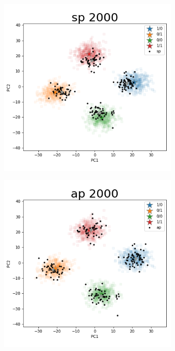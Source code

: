 \documentclass{article}
\begin{document}
\begin{figure}[p]
\begin{subfigure}{.5\textwidth}
  \centering
  \includegraphics[width=.98\linewidth]{img/ggsim2000_100000_200_2_1_100_1_sturef_ggsim2000_100000_2000_2_1_100_0_sp}
\end{subfigure}%
\begin{subfigure}{.5\textwidth}
  \centering
  \includegraphics[width=.98\linewidth]{img/ggsim2000_100000_200_2_1_100_1_sturef_ggsim2000_100000_2000_2_1_100_0_ap}

\end{subfigure}
\end{figure}
\end{document}
